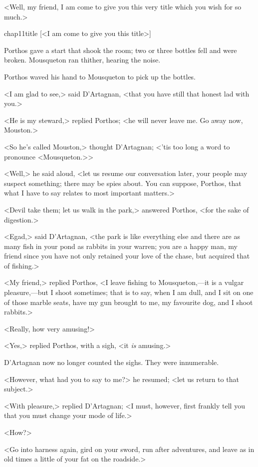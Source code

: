 <Well, my friend, I am come to give you this very title which you wish for so much.>

\begin{bwbigpic}
	[\basicscale] 
	{chap11title}
	[<I am come to give you this title>]
\end{bwbigpic}

Porthos gave a start that shook the room; two or three bottles fell and were broken. Mousqueton ran thither, hearing the noise.

Porthos waved his hand to Mousqueton to pick up the bottles.

<I am glad to see,> said D'Artagnan, <that you have still that honest lad with you.>

<He is my steward,> replied Porthos; <he will never leave me. Go away now, Mouston.>

<So he's called Mouston,> thought D'Artagnan; <'tis too long a word to pronounce <Mousqueton.>>

<Well,> he said aloud, <let us resume our conversation later, your people may suspect something; there may be spies about. You can suppose, Porthos, that what I have to say relates to most important matters.>

<Devil take them; let us walk in the park,> answered Porthos, <for the sake of digestion.>

<Egad,> said D'Artagnan, <the park is like everything else and there are as many fish in your pond as rabbits in your warren; you are a happy man, my friend since you have not only retained your love of the chase, but acquired that of fishing.>

<My friend,> replied Porthos, <I leave fishing to Mousqueton,—it is a vulgar pleasure,—but I shoot sometimes; that is to say, when I am dull, and I sit on one of those marble seats, have my gun brought to me, my favourite dog, and I shoot rabbits.>

<Really, how very amusing!>

<Yes,> replied Porthos, with a sigh, <it \emph{is} amusing.>

D'Artagnan now no longer counted the sighs. They were innumerable.

<However, what had you to say to me?> he resumed; <let us return to that subject.>

<With pleasure,> replied D'Artagnan; <I must, however, first frankly tell you that you must change your mode of life.>

<How?>

<Go into harness again, gird on your sword, run after adventures, and leave as in old times a little of your fat on the roadside.>

